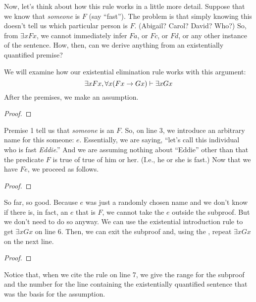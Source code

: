 Now, let's think about how this rule works in a little more detail. Suppose that we know that \emph{someone} is $F$ (say ``fast''). The problem is that simply knowing this doesn't tell us which particular person is $F$. (Abigail? Carol? David? Who?) So, from $\exists x Fx$, we cannot immediately infer $Fa$, or $Fc$, or $Fd$,  or any other instance of the sentence. How, then, can we derive anything from an existentially quantified premise?

We will examine how our existential elimination rule works with this argument:
$$\exists x Fx, \forall x(Fx \rightarrow Gx) \vdash \exists x Gx$$
After the premises, we make an assumption.
\begin{proof}
	 \pr{}
	 \pr{}
	\open
		 \as{}
\end{proof}
Premise 1 tell us that \emph{someone} is an $F$.  So, on line 3, we introduce an arbitrary name for this someone: $e$. Essentially, we are saying, ``let's call this individual who is fast \textit{Eddie}.'' And we are assuming nothing about ``Eddie'' other than that the predicate $F$ is true of true of him or her. (I.e., he or she is fast.) Now that we have $Fe$, we proceed as follows. 
\begin{proof}
	 \pr{}
	 \pr{}
	\open
		 \as{}
		 
\end{proof}
So far, so good. Because $e$ was just a randomly chosen name and we don't know if there is, in fact, an $e$ that is $F$, we cannot take the $e$ outside the subproof. But we don't need to do so anyway. We can use the existential introduction rule to get $\exists xGx$ on line 6. Then, we can exit the subproof and, using the , repeat $\exists xGx$ on the next line.
\begin{proof}
	 \pr{}
	 \pr{}
	\open
		 \as{}
		 
	\close
\end{proof}
Notice that, when we cite the rule on line 7, we give the range for the subproof and the number for the line containing the existentially quantified sentence that was the basis for the assumption.

